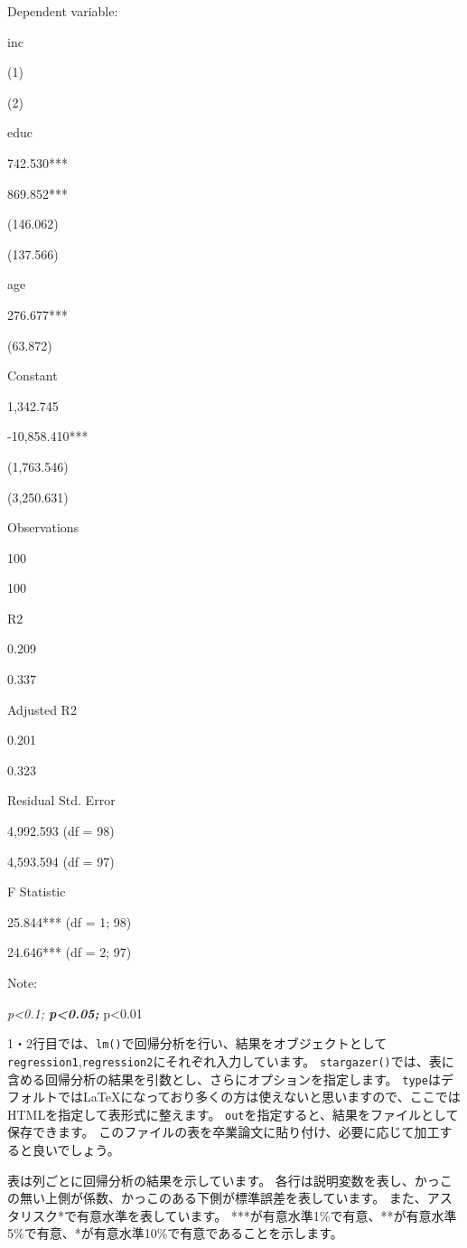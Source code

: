 \documentclass[
]{book}
\begin{document}
Dependent variable:

inc

(1)

(2)

educ

742.530***

869.852***

(146.062)

(137.566)

age

276.677***

(63.872)

Constant

1,342.745

-10,858.410***

(1,763.546)

(3,250.631)

Observations

100

100

R2

0.209

0.337

Adjusted R2

0.201

0.323

Residual Std. Error

4,992.593 (df = 98)

4,593.594 (df = 97)

F Statistic

25.844*** (df = 1; 98)

24.646*** (df = 2; 97)

Note:

\emph{p\textless0.1; \textbf{p\textless0.05; }}p\textless0.01

1・2行目では、\texttt{lm()}で回帰分析を行い、結果をオブジェクトとして\texttt{regression1},\texttt{regression2}にそれぞれ入力しています。
\texttt{stargazer()}では、表に含める回帰分析の結果を引数とし、さらにオプションを指定します。
\texttt{type}はデフォルトではLaTeXになっており多くの方は使えないと思いますので、ここではHTMLを指定して表形式に整えます。
\texttt{out}を指定すると、結果をファイルとして保存できます。
このファイルの表を卒業論文に貼り付け、必要に応じて加工すると良いでしょう。

表は列ごとに回帰分析の結果を示しています。
各行は説明変数を表し、かっこの無い上側が係数、かっこのある下側が標準誤差を表しています。
また、アスタリスク*で有意水準を表しています。
***が有意水準1\%で有意、**が有意水準5\%で有意、*が有意水準10\%で有意であることを示します。
\end{document}
